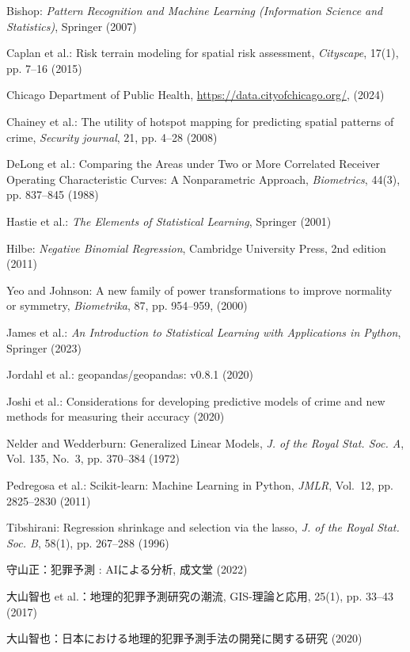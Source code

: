 \begin{thebibliography}{}

  Bishop: {\em Pattern Recognition and Machine Learning (Information Science and Statistics)}, Springer  (2007)
  
  Caplan et al.: Risk terrain modeling for spatial risk assessment, {\em Cityscape}, 17(1), pp. 7--16 (2015)
  
  Chicago Department of Public Health, \url{https://data.cityofchicago.org/}, (2024)
  
  Chainey et al.: The utility of hotspot mapping for predicting spatial patterns of crime, {\em Security journal}, 21, pp. 4--28 (2008)
  
  DeLong et al.: Comparing the Areas under Two or More Correlated Receiver Operating Characteristic Curves: A Nonparametric Approach, {\em Biometrics}, 44(3), pp. 837--845 (1988)
  
  Hastie et al.: {\em The Elements of Statistical Learning}, %
  Springer (2001)
  
  Hilbe: {\em Negative Binomial Regression}, Cambridge University Press, 2nd edition (2011)

  Yeo and Johnson: A new family of power transformations to improve normality or symmetry, {\em Biometrika}, 87, pp. 954--959, (2000)

  James et al.: {\em An Introduction to Statistical Learning with Applications in Python}, Springer (2023)
  
  Jordahl et al.: geopandas/geopandas: v0.8.1 (2020)
  
  Joshi et al.: Considerations for developing predictive models of crime and new methods for measuring their accuracy (2020)
  
  Nelder and Wedderburn: Generalized Linear Models, {\em J. of the Royal Stat. Soc. A}, Vol. 135, No.~3, pp. 370--384 (1972)
  
  Pedregosa et al.: Scikit-learn: Machine Learning in {P}ython, {\em JMLR}, Vol.~12, pp. 2825--2830 (2011)
  
  Tibshirani: Regression shrinkage and selection via the lasso, {\em J. of the Royal Stat. Soc. B}, 58(1),  pp. 267--288 (1996)
  
  守山正：犯罪予測 : AIによる分析, 成文堂 (2022)
  
  大山智也 et al.：地理的犯罪予測研究の潮流, GIS-理論と応用, 25(1), pp. 33--43 (2017)
  
  大山智也：日本における地理的犯罪予測手法の開発に関する研究 (2020)
  
  \end{thebibliography}
  